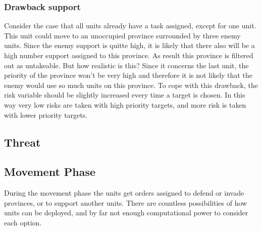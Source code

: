 \documentclass[a4paper]{article} %
\begin{document}
\subsubsection{Drawback support}
Consider the case that all units already have a task assigned, except for one unit. This unit could move to an unoccupied province surrounded by three enemy units. Since the enemy support is quitte high, it is likely that there also will be a high number support assigned to this province. As result this province is filtered out as untakeable. But how realistic is this? Since it concerns the last unit, the priority of the province won't be very high and therefore it is not likely that the enemy would use so much units on this province. To cope with this drawback, the risk variable should be slightly increased every time a target is chosen. In this way very low risks are taken with high priority targets, and more risk is taken with lower priority targets. 

\subsection{Threat}

\subsection{Movement Phase} 

During the movement phase the units get orders assigned to defend or invade provinces, or to support another units. There are countless possibilities of how units can be deployed, and by far not enough computational power to consider each option.   


\end{document}
